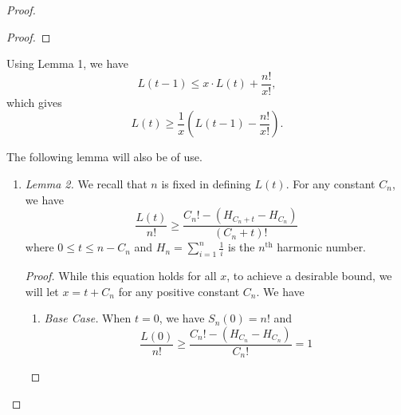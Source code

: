 \documentclass[12pt, a4paper]{article}
\newcommand{\nth}{^{\text{th}}}       %
\begin{document}
\begin{proof}
\begin{enumerate}[label=]
\begin{proof}
			\end{proof}
		\end{enumerate}
		
		Using Lemma 1, we have
		\begin{equation*}
			L(t-1) \le x\cdot L(t) + \frac{n!}{x!},
		\end{equation*}
		which gives
		\begin{equation*}
			L(t)\ge \frac{1}{x}\left(L(t-1)-\frac{n!}{x!}\right).
		\end{equation*}
		
		The following lemma will also be of use.
		\begin{enumerate}[label=]
			\item\textit{Lemma 2.} We recall that $n$ is fixed in defining $L(t)$. For any constant $C_n$, we have
			\begin{equation*}
				\frac{L(t)}{n!}\ge \frac{C_{n}! - (H_{C_{n}+t} - H_{C_{n}})}{(C_n+t)!}
			\end{equation*}
			where $0\le t\le n-C_{n}$ and $H_n=\sum_{i = 1}^n\frac{1}{i}$ is the $n\nth$ harmonic number.
		\begin{proof}
			While this equation holds for all $x$, to achieve a desirable bound, we will
		let $x=t+C_{n}$ for any positive constant $C_{n}$. We have
		\begin{enumerate}[label=]
		\item\textit{Base Case.} When $t=0$, we have $S_n(0)= n!$ and
			\begin{equation*}
			\frac{L(0)}{n!}\ge \frac{C_{n}! - (H_{C_{n}}-H_{C_{n}})}{C_{n}!} = 1
			\end{equation*}
			

\end{enumerate}
\end{proof}
\end{enumerate}
\end{proof}
\end{document}
